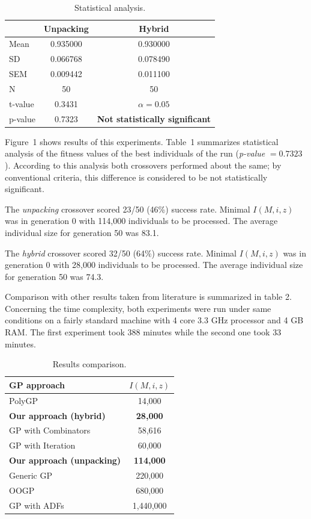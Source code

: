 \documentclass{sig-alternate}
\begin{document}
\begin{table}[t]
\centering
\begin{tabular}{|l|cc|}
\hline
& Unpacking & Hybrid \\
\hline
Mean & 0.935000	& 0.930000 \\
SD	 & 0.066768	& 0.078490 \\
SEM	 & 0.009442	& 0.011100 \\
N	 & 50    & 50    \\
\hline
t-value &  0.3431 & $\alpha = 0.05$\\
p-value &  0.7323 &  \textbf{Not statistically significant}\\
\hline
\end{tabular}
\caption{Statistical analysis.}
\end{table}

Figure~1 shows results of this experiments. 
Table~1 summarizes statistical analysis
of the fitness values of the best individuals of the run 
(\textit{p-value} $ = 0.7323$).  
According to this analysis both crossovers performed about the same;
by conventional criteria, this difference is considered to be not 
statistically significant.

The \textit{unpacking} crossover scored 23/50 (46\%) success rate. 
Minimal $I(M,i,z)$ was in generation 0 with 114,000 individuals to be processed.
The average individual size for generation 50 was 83.1.


The \textit{hybrid} crossover scored 32/50 (64\%) success rate. 
Minimal $I(M,i,z)$ was in generation 0 with 28,000 individuals to be processed.
The average individual size for generation 50 was 74.3.

Comparison with other results taken from literature is summarized in table 2.
Concerning the time complexity, both experiments were run under same conditions on a fairly standard machine with 4 core 3.3 GHz processor and 4 GB RAM. The first experiment took 388 minutes while the second one took 
33 minutes.

\begin{table}[t]
\centering
\begin{tabular}{|l|c|}
\hline
GP approach &  $I(M,i,z)$ \\
\hline
PolyGP                 &  14,000       \\
\textbf{Our approach (hybrid)}&  \textbf{28,000} \\
GP with Combinators	   &  58,616        \\
GP with Iteration      &  60,000       \\
\textbf{Our approach (unpacking)}&  \textbf{114,000} \\
Generic GP	           &  220,000      \\
OOGP	               &  680,000      \\
GP with ADFs           &1,440,000      \\
\hline
\end{tabular}
\caption{Results comparison.}
\end{table}
\end{document}
